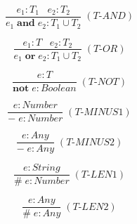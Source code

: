 \documentclass[12pt]{article}
\begin{document}
\[
\frac{e_{1}:T_{1} \;\;\; e_{2}:T_{2}}
     {e_{1} \; \textbf{and} \; e_{2} : T_{1} \cup T_{2}} \; (\textit{T-AND})
\]

\[
\frac{e_{1}:T \;\;\; e_{2}:T_{2}}
     {e_{1} \; \textbf{or} \; e_{2} : T_{1} \cup T_{2}} \; (\textit{T-OR})
\]

\[
\frac{e:T}
     {\textbf{not} \; e : Boolean} \; (\textit{T-NOT})
\]

\[
\frac{e:Number}
     {- \; e : Number} \; (\textit{T-MINUS1})
\]

\[
\frac{e:Any}
     {- \; e : Any} \; (\textit{T-MINUS2})
\]

\[
\frac{e : String}
     {\# \; e : Number} \; (\textit{T-LEN1})
\]

\[
\frac{e : Any}
     {\# \; e : Any} \; (\textit{T-LEN2})
\]
\end{document}

